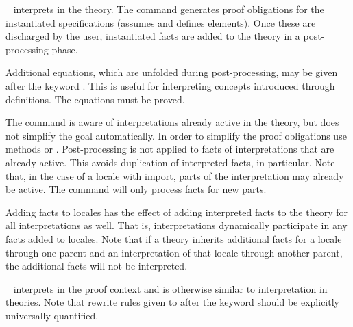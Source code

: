 \begin{isabellebody}
\begin{isamarkuptext}
  \begin{description}

  \item \hyperlink{command.interpretation}{\mbox{}}~
  interprets  in the theory.  The command generates proof
  obligations for the instantiated specifications (assumes and defines
  elements).  Once these are discharged by the user, instantiated
  facts are added to the theory in a post-processing phase.

  Additional equations, which are unfolded during
  post-processing, may be given after the keyword \hyperlink{keyword.where}{\mbox{}}.
  This is useful for interpreting concepts introduced through
  definitions.  The equations must be proved.

  The command is aware of interpretations already active in the
  theory, but does not simplify the goal automatically.  In order to
  simplify the proof obligations use methods \hyperlink{method.intro-locales}{\mbox{}}
  or \hyperlink{method.unfold-locales}{\mbox{}}.  Post-processing is not applied to
  facts of interpretations that are already active.  This avoids
  duplication of interpreted facts, in particular.  Note that, in the
  case of a locale with import, parts of the interpretation may
  already be active.  The command will only process facts for new
  parts.

  Adding facts to locales has the effect of adding interpreted facts
  to the theory for all interpretations as well.  That is,
  interpretations dynamically participate in any facts added to
  locales.  Note that if a theory inherits additional facts for a
  locale through one parent and an interpretation of that locale
  through another parent, the additional facts will not be
  interpreted.

  \item \hyperlink{command.interpret}{\mbox{}}~ interprets
   in the proof context and is otherwise similar to
  interpretation in theories.  Note that rewrite rules given to
  \hyperlink{command.interpret}{\mbox{}} after the \hyperlink{keyword.where}{\mbox{}} keyword should be
  explicitly universally quantified.


\end{description}
\end{isamarkuptext}
\end{isabellebody}
